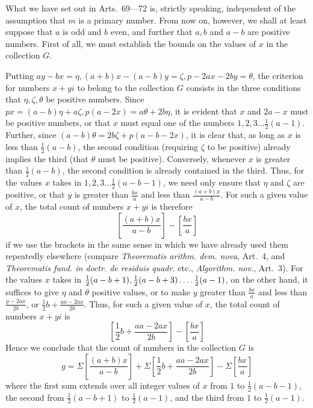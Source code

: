 \newpage
{}
What we have set out in Arts.~69---72 is, strictly speaking, independent of the assumption that $m$ is a primary number. From now on, however, we shall at least suppose that $a$ is odd and $b$ even, and further that $a,b$ and $a-b$ are positive numbers. First of all, we must establish the bounds on the values of $x$ in the collection $G$.

%
Putting $ay-bx=\eta,(a+b)x-(a-b)y=\zeta,p-2ax-2by=\theta$, the criterion for numbers $x+yi$ to belong to the collection $G$ consists in the three conditions that $\eta,\zeta,\theta$ be positive numbers. Since $px=(a-b)\eta+a\zeta,p(a-2x)=a\theta+2b\eta$, it is evident that $x$ and $2a-x$ must be positive numbers, or that $x$ must equal one of the numbers $1,2,3\ldots\frac12(a-1)$. Further, since $(a-b)\theta=2b\zeta+p(a-b-2x)$, it is clear that, as long as $x$ is less than $\frac12(a-b)$, the second condition (requiring $\zeta$ to be positive) already implies the third (that $\theta$ must be positive). Conversely, whenever $x$ is greater than $\frac12(a-b)$, the second condition is already contained in the third. Thus, for the values $x$ takes in $1,2,3\ldots\frac12(a-b-1)$, we need only ensure that $\eta$ and $\zeta$ are positive, or that $y$ is greater than $\frac{bx}{a}$ and less than $\frac{(a+b)x}{a-b}$. For such a given value of $x$, the total count of numbers $x+yi$ is therefore
\[
\left[\frac{(a+b)x}{a-b}\right]-\left[\frac{bx}{a}\right]
\]
if we use the brackets in the same sense in which we have already used them repeatedly elsewhere (compare \emph{Theorematis arithm. dem. nova}, Art.~4, and \emph{Theorematis fund. in doctr. de residuis quadr.} etc., \emph{Algorithm. nov.}, Art.~3). For the values $x$ takes in $\frac12(a-b+1),\frac12(a-b+3)\mathinner{.\,.\,.\,.}\frac12(a-1)$, on the other hand, it suffices to give $\eta$ and $\theta$ positive values, or to make $y$ greater than $\frac{bx}{a}$ and less than $\frac{p-2ax}{2b}$, or $\frac12b+\frac{aa-2ax}{2b}$. Thus, for such a given value of $x$, the total count of numbers $x+yi$ is
\[
\left[\frac12b+\frac{aa-2ax}{2b}\right]-\left[\frac{bx}{a}\right]
\]
Hence we conclude that the count of numbers in the collection $G$ is
\[
g=\Sigma\left[\frac{(a+b)x}{a-b}\right]+\Sigma\left[\frac12b+\frac{aa-2ax}{2b}\right]-\Sigma\left[\frac{bx}{a}\right]
\]
where the first sum extends over all integer values of $x$ from $1$ to $\frac12(a-b-1)$, the second from $\frac12(a-b+1)$ to $\frac12(a-1)$, and the third from $1$ to $\frac12(a-1)$.

